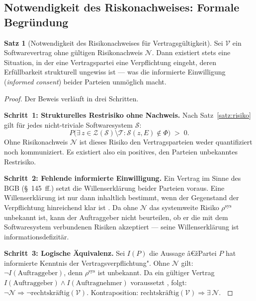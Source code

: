 ﻿\documentclass[a4paper,12pt]{article}
\theoremstyle{definition}
\newtheorem{satz}{Satz}
\newenvironment{beweis}{\begin{proof}}{\end{proof}}
\begin{document}
\subsection{Notwendigkeit des Riskonachweises: Formale Begr\"undung}

\begin{satz}[Notwendigkeit des Risikona\-chweis\-es f\"ur Vertragsg\"ultigkeit]
\label{satz:notwendigkeit}
    Sei $\mathcal{V}$ ein Softwarevertrag ohne g\"ultigen Risikonachweis $\mathcal{N}$.
    Dann existiert stets eine Situation, in der eine Vertragspartei eine
    Verpflichtung eingeht, deren Erf\"ullbarkeit strukturell ungewiss ist ---
    was die informierte Einwilligung (\emph{informed consent}) beider Parteien
    unm\"oglich macht.
\end{satz}

\begin{beweis}
    Der Beweis verl\"auft in drei Schritten.

    \textbf{Schritt~1: Strukturelles Restrisiko ohne Nachweis.}
    Nach Satz~\ref{satz:risiko} gilt f\"ur jedes nicht-triviale Softwaresystem
    $\mathcal{S}$:
    \[
        P\bigl(\exists\, z \in \mathcal{Z}(\mathcal{S}) \setminus \mathcal{T}
        \colon \mathcal{S}(z,E) \notin \Phi\bigr) \;>\; 0.
    \]
    Ohne Risikonachweis $\mathcal{N}$ ist dieses Risiko den Vertragsparteien weder
    quantifiziert noch kommuniziert. Es existiert also ein positives, den Parteien
    unbekanntes Restrisiko.

    \textbf{Schritt~2: Fehlende informierte Einwilligung.}
    Ein Vertrag im Sinne des BGB (\S~145~ff.) setzt die Willenserkl\"arung beider
    Parteien voraus. Eine Willenserkl\"arung ist nur dann inhaltlich bestimmt, wenn
    der Gegenstand der Verpflichtung hinreichend klar ist \cite{kilian2017}. Da ohne
    $\mathcal{N}$ das systemweite Risiko $\rho^{\mathrm{sys}}$ unbekannt ist, kann
    der Auftraggeber nicht beurteilen, ob er die mit dem Softwaresystem verbundenen
    Risiken akzeptiert --- seine Willenserkl\"arung ist informationsdefizit\"ar.

    \textbf{Schritt~3: Logische \"Aquivalenz.}
    Sei $I(P)$ die Aussage â€žPartei $P$ hat informierte Kenntnis der
    Vertragsverpflichtung". Ohne $\mathcal{N}$ gilt:
    $\neg I(\text{Auftraggeber})$, denn $\rho^{\mathrm{sys}}$ ist unbekannt.
    Da ein g\"ultiger Vertrag $I(\text{Auftraggeber}) \wedge
    I(\text{Auftragnehmer})$ voraussetzt \cite{kilian2017}, folgt:
    $\neg \mathcal{N} \Rightarrow \neg \text{rechtskr\"aftig}(\mathcal{V})$.
    Kontraposition: $\text{rechtskr\"aftig}(\mathcal{V}) \Rightarrow
    \exists\, \mathcal{N}$. $\qedhere$
\end{beweis}
\end{document}
